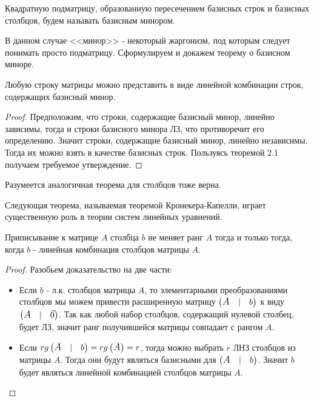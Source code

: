 \begin{definition}
   Квадратную подматрицу, образованную пересечением базисных строк и базисных столбцов, будем называть базисным минором. 
\end{definition}
В данном случае <<минор>> - некоторый жаргонизм, под которым следует понимать просто подматрицу. Сформулируем и докажем теорему о базисном миноре.
\label{Теорема о базисном миноре.}
\begin{theorem}
    Любую строку матрицы можно представить в виде линейной комбинации строк, содержащих базисный минор.
\end{theorem}
\begin{proof}
    Предположим, что строки, содержащие базисный минор, линейно зависимы, тогда и строки базисного минора ЛЗ, что противоречит его определению. Значит строки, содержащие базисный минор, линейно независимы. Тогда их можно взять в качестве базисных строк. Пользуясь теоремой 2.1 получаем требуемое утверждение.
\end{proof}
\begin{note}
Разумеется аналогичная теорема для столбцов тоже верна.
\end{note}
Следующая теорема, называемая теоремой Кронекера-Капелли, играет существенную роль в теории систем линейных уравнений.
\begin{theorem} 
    Приписывание к матрице $A$  столбца $b$ не меняет ранг $A$ тогда и только тогда, когда $b$ - линейная комбинация столбцов матрицы $A$.
\end{theorem}
\begin{proof}
    Разобьем доказательство на две части:
    \begin{itemize}
        \item[$\Leftarrow$] Если $b$ - л.к. столбцов матрицы $A$, то элементарными преобразованиями столбцов мы можем привести расширенную матрицу $ \left( \begin{matrix} \text{\large \textit{A}} & |& b \end{matrix} \right) $ к виду $ \left( \begin{matrix} \text{\large \textit{A}} & |& \vec{0} \end{matrix} \right) $. Так как любой набор столбцов, содержащий нулевой столбец, будет ЛЗ, значит ранг получившейся матрицы совпадает с рангом $A$. 
        \item[$\Rightarrow$] Если $rg \left( \begin{matrix} \text{\large \textit{A}} & |& b \end{matrix} \right) =rg \left( \begin{matrix} \text{\large \textit{A}} \end{matrix} \right)=r$, тогда можно выбрать $r$ ЛНЗ столбцов из матрицы $A$. Тогда они будут являться базисными для $ \left( \begin{matrix} \text{\large \textit{A}} & |& b \end{matrix} \right) $. Значит $b$ будет являться линейной комбинацией столбцов матрицы $A$.
    \end{itemize}
\end{proof}
